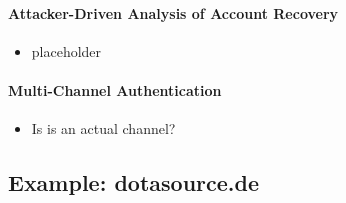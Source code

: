 \paragraph{Attacker-Driven Analysis of Account Recovery}
\begin{itemize}
	\item placeholder
\end{itemize}

\paragraph{Multi-Channel Authentication}
\begin{itemize}
	\item Is is an actual channel?
\end{itemize}

\subsection{Example: dotasource.de}